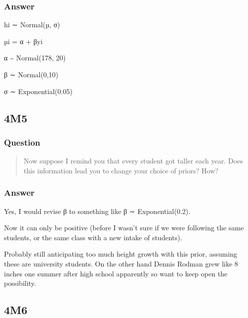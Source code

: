 \documentclass[
]{book}
\begin{document}
\hypertarget{answer-41}{%
\subsubsection*{Answer}\label{answer-41}}

hi ∼ Normal(µ, σ)

µi = α + βyi

α \textasciitilde{} Normal(178, 20)

β ∼ Normal(0,10)

σ ∼ Exponential(0.05)

\hypertarget{m5-2}{%
\subsection*{4M5}\label{m5-2}}

\hypertarget{question-42}{%
\subsubsection*{Question}\label{question-42}}

\begin{quote}
Now suppose I remind you that every student got taller each year. Does this information lead you to change your choice of priors? How?
\end{quote}

\hypertarget{answer-42}{%
\subsubsection*{Answer}\label{answer-42}}

Yes, I would revise β to something like β ∼ Exponential(0.2).

Now it can only be positive (before I wasn't sure if we were following the same students, or the same class with a new intake of students).

Probably still anticipating too much height growth with this prior, assuming these are university students. On the other hand Dennis Rodman grew like 8 inches one summer after high school apparently so want to keep open the possibility.

\hypertarget{m6-2}{%
\subsection*{4M6}\label{m6-2}}
\end{document}
